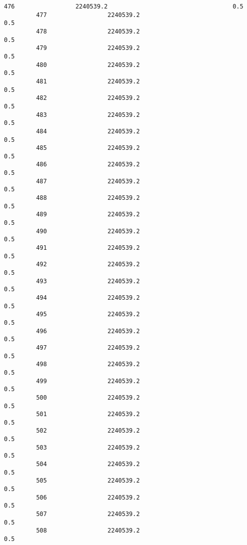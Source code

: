 \documentclass{article}
\begin{document}
\begin{Verbatim}[commandchars=\\\{\}]
         476                 2240539.2                                   0.5  
         477                 2240539.2                                   0.5  
         478                 2240539.2                                   0.5  
         479                 2240539.2                                   0.5  
         480                 2240539.2                                   0.5  
         481                 2240539.2                                   0.5  
         482                 2240539.2                                   0.5  
         483                 2240539.2                                   0.5  
         484                 2240539.2                                   0.5  
         485                 2240539.2                                   0.5  
         486                 2240539.2                                   0.5  
         487                 2240539.2                                   0.5  
         488                 2240539.2                                   0.5  
         489                 2240539.2                                   0.5  
         490                 2240539.2                                   0.5  
         491                 2240539.2                                   0.5  
         492                 2240539.2                                   0.5  
         493                 2240539.2                                   0.5  
         494                 2240539.2                                   0.5  
         495                 2240539.2                                   0.5  
         496                 2240539.2                                   0.5  
         497                 2240539.2                                   0.5  
         498                 2240539.2                                   0.5  
         499                 2240539.2                                   0.5  
         500                 2240539.2                                   0.5  
         501                 2240539.2                                   0.5  
         502                 2240539.2                                   0.5  
         503                 2240539.2                                   0.5  
         504                 2240539.2                                   0.5  
         505                 2240539.2                                   0.5  
         506                 2240539.2                                   0.5  
         507                 2240539.2                                   0.5  
         508                 2240539.2                                   0.5  

\end{Verbatim}
\end{document}
